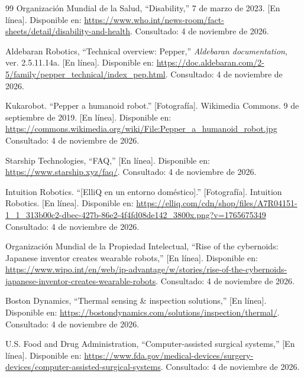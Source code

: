 \documentclass[11pt,a4paper]{article}
\begin{document}
\begin{thebibliography}{99}
Organización Mundial de la Salud, ``Disability,'' 7 de marzo de 2023.
[En línea]. Disponible en: \url{https://www.who.int/news-room/fact-sheets/detail/disability-and-health}. Consultado: 4 de noviembre de 2026.

Aldebaran Robotics, ``Technical overview: Pepper,'' \emph{Aldebaran documentation}, ver. 2.5.11.14a. [En línea]. Disponible en: \url{https://doc.aldebaran.com/2-5/family/pepper_technical/index_pep.html}. Consultado: 4 de noviembre de 2026.

Kukarobot. ``Pepper a humanoid robot.'' [Fotografía]. Wikimedia Commons. 9 de septiembre de 2019. [En línea]. Disponible en: \url{https://commons.wikimedia.org/wiki/File:Pepper_a_humanoid_robot.jpg} Consultado: 4 de noviembre de 2026.

Starship Technologies, ``FAQ,''
[En línea]. Disponible en: \url{https://www.starship.xyz/faq/}. Consultado: 4 de noviembre de 2026.

Intuition Robotics. ``[ElliQ en un entorno doméstico].'' [Fotografía]. Intuition Robotics. [En línea]. Disponible en: \url{https://elliq.com/cdn/shop/files/A7R04151-1_1_313b00c2-dbec-427b-86e2-4f4fd08de142_3800x.png?v=1765675349} Consultado: 4 de noviembre de 2026.

Organización Mundial de la Propiedad Intelectual, ``Rise of the cybernoids: Japanese inventor creates wearable robots,'' [En línea]. Disponible en: \url{https://www.wipo.int/en/web/ip-advantage/w/stories/rise-of-the-cybernoids-japanese-inventor-creates-wearable-robots}. Consultado: 4 de noviembre de 2026.

Boston Dynamics, ``Thermal sensing \& inspection solutions,''
[En línea]. Disponible en: \url{https://bostondynamics.com/solutions/inspection/thermal/}. Consultado: 4 de noviembre de 2026.

U.S. Food and Drug Administration, ``Computer-assisted surgical systems,''
[En línea]. Disponible en: \url{https://www.fda.gov/medical-devices/surgery-devices/computer-assisted-surgical-systems}. Consultado: 4 de noviembre de 2026.

\end{thebibliography}
\endgroup
\end{document}
